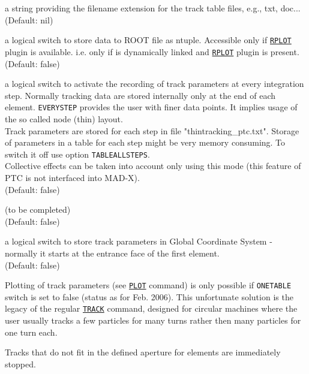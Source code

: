 \begin{madlist}
    a string providing the filename extension for the
   track table files, e.g., txt, doc...  \\ (Default: nil)

    a logical switch to store data to ROOT file as
   ntuple. Accessible only if \hyperref[sec:rplot]{\texttt{RPLOT}} plugin is
   available. i.e. only if \madx is dynamically linked and
   \hyperref[sec:rplot]{\texttt{RPLOT}} plugin is present. \\ 
   (Default: false)

    a logical switch to activate the recording of
   track parameters at every integration step. Normally tracking data
   are stored internally only at the end of each element. \texttt{EVERYSTEP}
   provides the user with finer data points. It implies usage of the so
   called node (thin) layout. \\ 
   Track parameters are stored for each step in file
   "thintracking\_ptc.txt". Storage of parameters in a table for each
   step might be very memory consuming. To switch it off use option
   \texttt{TABLEALLSTEPS}.\\  
   Collective effects can be taken into account only using this mode
   (this feature of PTC is not interfaced into MAD-X). \\
   (Default: false)

    (to be completed) \\ (Default: false)
   
    a logical switch to store track parameters in Global
   Coordinate System - normally it starts at the entrance face of the
   first element. \\ (Default: false)
\end{madlist}



Plotting of track parameters (see \hyperref[sec:plot]{\texttt{PLOT}}
command) is only possible if \texttt{ONETABLE} switch is set to false (status 
as for Feb. 2006). This unfortunate solution is the legacy of the
regular \madx \hyperref[chap:thintrack]{\texttt{TRACK}} command, 
designed for circular machines where the user usually tracks a few
particles for many turns rather then many particles for one turn each.

Tracks that do not fit in the defined aperture for elements are
immediately stopped.  


